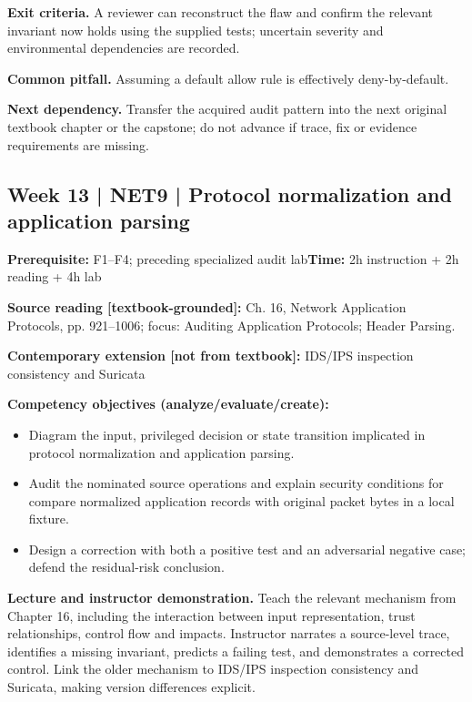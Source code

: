 \documentclass[10pt,letterpaper]{article}
\begin{document}
\textbf{Exit criteria.} A reviewer can reconstruct the flaw and confirm the relevant invariant now holds using the supplied tests; uncertain severity and environmental dependencies are recorded.

\textbf{Common pitfall.} Assuming a default allow rule is effectively deny-by-default.

\textbf{Next dependency.} Transfer the acquired audit pattern into the next original textbook chapter or the capstone; do not advance if trace, fix or evidence requirements are missing.

\subsection{Week 13 | NET9 | Protocol normalization and application parsing}
\textbf{Prerequisite:} F1--F4; preceding specialized audit lab\hfill\textbf{Time:} 2h instruction + 2h reading + 4h lab

\textbf{Source reading [textbook-grounded]:} Ch. 16, Network Application Protocols, pp. 921--1006; focus: Auditing Application Protocols; Header Parsing.

\textbf{Contemporary extension [not from textbook]:} IDS/IPS inspection consistency and Suricata

\textbf{Competency objectives (analyze/evaluate/create):}
\begin{itemize}[leftmargin=*,itemsep=2pt]
\item Diagram the input, privileged decision or state transition implicated in protocol normalization and application parsing.
\item Audit the nominated source operations and explain security conditions for compare normalized application records with original packet bytes in a local fixture.
\item Design a correction with both a positive test and an adversarial negative case; defend the residual-risk conclusion.
\end{itemize}
\textbf{Lecture and instructor demonstration.} Teach the relevant mechanism from Chapter 16, including the interaction between input representation, trust relationships, control flow and impacts. Instructor narrates a source-level trace, identifies a missing invariant, predicts a failing test, and demonstrates a corrected control. Link the older mechanism to IDS/IPS inspection consistency and Suricata, making version differences explicit.
\end{document}
